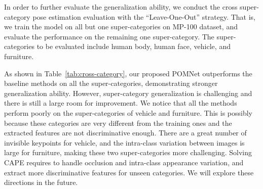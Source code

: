 \documentclass[runningheads]{llncs}
\begin{document}
{\begin{table*}[t]
    \setlength\tabcolsep{6pt}
	\caption{Cross super-category evaluation (PCK). POMNet outperforms other methods. But there is still large room for improvement on the rare categories.}
	\label{tab:cross-category}
	\begin{center}
	\end{center}
\end{table*}


In order to further evaluate the generalization ability, we conduct the cross super-category pose estimation evaluation with the ``Leave-One-Out'' strategy.
That is, we train the model on all but one super-categories on MP-100 dataset, and evaluate the performance on the remaining one super-category. The super-categories to be evaluated include human body, human face, vehicle, and furniture.

As shown in Table~\ref{tab:cross-category}, our proposed POMNet outperforms the baseline methods on all the super-categories, demonstrating stronger generalization ability. However, super-category generalization is challenging and there is still a large room for improvement. We notice that all the methods perform poorly on the super-categories of vehicle and furniture. This is possibly because these categories are very different from the training ones and the extracted features are not discriminative enough. There are a great number of invisible keypoints for vehicle, and the intra-class variation between images is large for furniture, making these two super-categories more challenging. Solving CAPE requires to handle occlusion and intra-class appearance variation, and extract more discriminative features for unseen categories. We will explore these directions in the future.


}
\end{document}
